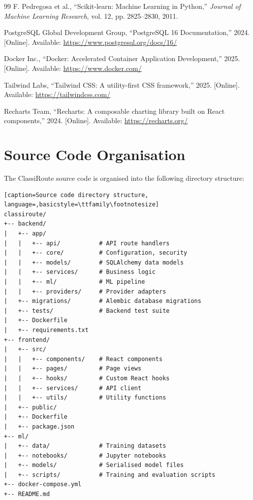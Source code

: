 \documentclass[oneside,12pt,a4paper]{report}
\begin{document}
\begin{thebibliography}{99}
F. Pedregosa et al., ``Scikit-learn: Machine Learning in Python,'' \textit{Journal of Machine Learning Research}, vol. 12, pp. 2825--2830, 2011.

PostgreSQL Global Development Group, ``PostgreSQL 16 Documentation,'' 2024. [Online]. Available: \url{https://www.postgresql.org/docs/16/}

Docker Inc., ``Docker: Accelerated Container Application Development,'' 2025. [Online]. Available: \url{https://www.docker.com/}

Tailwind Labs, ``Tailwind CSS: A utility-first CSS framework,'' 2025. [Online]. Available: \url{https://tailwindcss.com/}

Recharts Team, ``Recharts: A composable charting library built on React components,'' 2024. [Online]. Available: \url{https://recharts.org/}

\end{thebibliography}

\appendix
\chapter{Source Code Organisation}

The ClassiRoute source code is organised into the following directory structure:

\begin{lstlisting}[caption=Source code directory structure, language=,basicstyle=\ttfamily\footnotesize]
classiroute/
+-- backend/
|   +-- app/
|   |   +-- api/           # API route handlers
|   |   +-- core/          # Configuration, security
|   |   +-- models/        # SQLAlchemy data models
|   |   +-- services/      # Business logic
|   |   +-- ml/            # ML pipeline
|   |   +-- providers/     # Provider adapters
|   +-- migrations/        # Alembic database migrations
|   +-- tests/             # Backend test suite
|   +-- Dockerfile
|   +-- requirements.txt
+-- frontend/
|   +-- src/
|   |   +-- components/    # React components
|   |   +-- pages/         # Page views
|   |   +-- hooks/         # Custom React hooks
|   |   +-- services/      # API client
|   |   +-- utils/         # Utility functions
|   +-- public/
|   +-- Dockerfile
|   +-- package.json
+-- ml/
|   +-- data/              # Training datasets
|   +-- notebooks/         # Jupyter notebooks
|   +-- models/            # Serialised model files
|   +-- scripts/           # Training and evaluation scripts
+-- docker-compose.yml
+-- README.md
\end{lstlisting}
\end{document}
